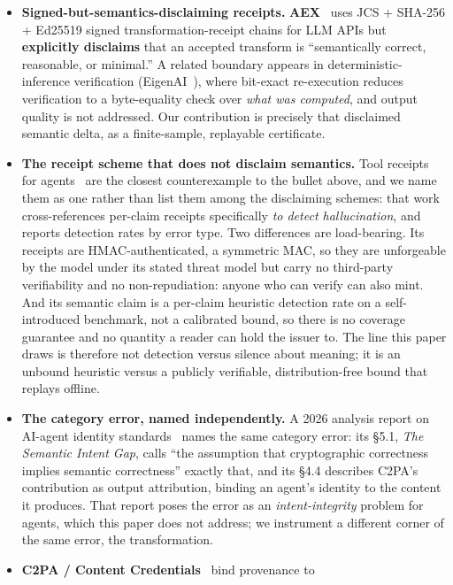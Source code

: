\documentclass[11pt]{article}
\theoremstyle{definition}
\begin{document}
\begin{itemize}
\item \textbf{Signed-but-semantics-disclaiming receipts.}
  \textbf{AEX}~\cite{aex2026} uses JCS + SHA-256 + Ed25519 signed
  transformation-receipt chains for LLM APIs but \textbf{explicitly
  disclaims} that an accepted transform is ``semantically correct,
  reasonable, or minimal.'' A related boundary appears in deterministic-inference
  verification (EigenAI~\cite{eigenai2026}), where bit-exact re-execution
  reduces verification to a byte-equality check over \emph{what was
  computed}, and output quality is not addressed. Our
  contribution is precisely that disclaimed semantic delta, as a
  finite-sample, replayable certificate.
\item \textbf{The receipt scheme that does not disclaim semantics.} Tool
  receipts for agents~\cite{toolreceipts2026} are the closest counterexample
  to the bullet above, and we name them as one rather than list them among
  the disclaiming schemes: that work cross-references per-claim receipts
  specifically \emph{to detect hallucination}, and reports detection rates by
  error type. Two differences are load-bearing. Its receipts are
  HMAC-authenticated, a symmetric MAC, so they are unforgeable by the model
  under its stated threat model but carry no third-party verifiability and no
  non-repudiation: anyone who can verify can also mint. And its semantic claim
  is a per-claim heuristic detection rate on a self-introduced benchmark, not
  a calibrated bound, so there is no coverage guarantee and no quantity a
  reader can hold the issuer to. The line this paper draws is therefore not
  detection versus silence about meaning; it is an unbound heuristic versus a
  publicly verifiable, distribution-free bound that replays offline.
\item \textbf{The category error, named independently.} A 2026 analysis
  report on AI-agent identity standards~\cite{survey2026} names the same
  category error: its \S5.1, \emph{The Semantic Intent Gap}, calls
  ``the assumption that cryptographic correctness implies semantic
  correctness'' exactly that, and its \S4.4 describes C2PA's contribution
  as output attribution, binding an agent's identity to the content it
  produces. That report poses the error as an \emph{intent-integrity}
  problem for agents, which this paper does not address; we instrument a
  different corner of the same error, the transformation.
\item \textbf{C2PA / Content Credentials}~\cite{c2pa} bind provenance to

\end{itemize}
\end{document}
